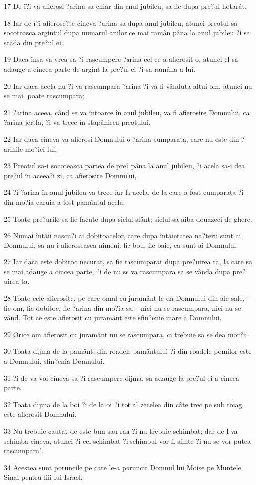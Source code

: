 \par 17 De î?i va afierosi ?arina sa chiar din anul jubileu, sa fie dupa pre?ul hotarât.
\par 18 Iar de î?i afierose?te cineva ?arina sa dupa anul jubileu, atunci preotul sa socoteasca argintul dupa numarul anilor ce mai ramân pâna la anul jubileu ?i sa scada din pre?ul ei.
\par 19 Daca însa va vrea sa-?i rascumpere ?arina cel ce a afierosit-o, atunci el sa adauge a cincea parte de argint la pre?ul ei ?i sa ramâna a lui.
\par 20 Iar daca acela nu-?i va rascumpara ?arina ?i va fi vânduta altui om, atunci nu se mai. poate rascumpara;
\par 21 ?arina aceea, când se va întoarce în anul jubileu, va fi afierosire Domnului, ca ?arina jertfa, ?i va trece în stapânirea preotului.
\par 22 Iar daca cineva va afierosi Domnului o ?arina cumparata, care nu este din ?arinile mo?iei lui,
\par 23 Preotul sa-i socoteasca partea de pre? pâna la anul jubileu, ?i acela sa-i dea pre?ul în aceea?i zi, ca afierosire Domnului,
\par 24 ?i ?arina în anul jubileu va trece iar la acela, de la care a fost cumparata ?i din mo?ia caruia a fost pamântul acela.
\par 25 Toate pre?urile sa fie facute dupa siclul sfânt; siclul sa aiba douazeci de ghere.
\par 26 Numai întâii nascu?i ai dobitoacelor, care dupa întâietatea na?terii sunt ai Domnului, sa nu-i afieroseasca nimeni: fie bou, fie oaie, ca sunt ai Domnului.
\par 27 Iar daca este dobitoc necurat, sa fie rascumparat dupa pre?uirea ta, la care sa se mai adauge a cincea parte, ?i de nu se va rascumpara sa se vânda dupa pre?uirea ta.
\par 28 Toate cele afierosite, pe care omul cu juramânt le da Domnului din ale sale, - fie om, fie dobitoc, fie ?arina din mo?ia sa, - nici nu se rascumpara, nici nu se vând. Tot ce este afierosit cu juramânt este sfin?enie mare a Domnului.
\par 29 Orice om afierosit cu juramânt nu se rascumpara, ci trebuie sa se dea mor?ii.
\par 30 Toata dijma de la pamânt, din roadele pamântului ?i din roadele pomilor este a Domnului, sfin?enia Domnului.
\par 31 ?i de va voi cineva sa-?i rascumpere dijma, sa adauge la pre?ul ei a cincea parte.
\par 32 Toata dijma de la boi ?i de la oi ?i tot al zecelea din câte trec pe sub toiag este afierosit Domnului.
\par 33 Nu trebuie cautat de este bun sau rau ?i nu trebuie schimbat; dar de-l va schimba cineva, atunci ?i cel schimbat ?i schimbul vor fi sfinte ?i nu se vor putea rascumpara".
\par 34 Acestea sunt poruncile pe care le-a poruncit Domnul lui Moise pe Muntele Sinai pentru fiii lui Israel.



